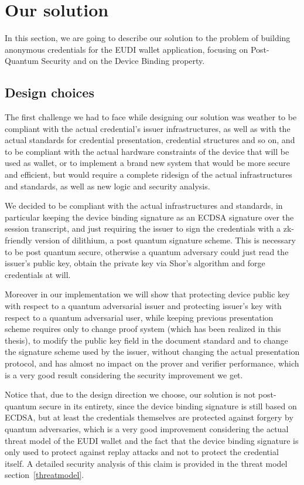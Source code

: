 \documentclass{article}
\begin{document}
\section{Our solution}
\label{oursolution}
In this section, we are going to describe our solution to the problem of building anonymous credentials for the EUDI wallet
application, focusing on Post-Quantum Security and on the Device Binding property.

\subsection{Design choices}
\label{designchoice}
The first challenge we had to face while designing our solution was weather to be compliant with the actual credential's
issuer infrastructures, as well as with the actual standards for credential presentation, credential structures and so on,
and to be compliant with the actual hardware constraints of the device that will be used as wallet, or to implement a brand
new system that would be more secure and efficient, but would require a complete ridesign of the actual infrastructures and 
standards, as well as new logic and security analysis.

We decided to be compliant with the actual infrastructures and standards, in particular keeping the device binding signature
as an ECDSA signature over the session transcript, and just requiring the issuer to sign the credentials with a zk-friendly version of 
dilithium, a post quantum signature scheme. This is necessary to be post quantum secure, otherwise a quantum adversary could
just read the issuer's public key, obtain the private key via Shor's algorithm and forge credentials at will.

Moreover in our implementation we will show that protecting device public key with respect to a quantum adversarial issuer
and protecting issuer's key with respect to a quantum adversarial user, while keeping previous presentation scheme requires
only to change proof system (which has been realized in this thesis), to modify the public key field in the document standard
and to change the signature scheme used by the issuer, without changing the actual presentation protocol, and has almost
no impact on the prover and verifier performance, which is a very good result considering the security improvement we get.

Notice that, due to the design direction we choose, our solution is not post-quantum secure in its entirety, since the device binding
signature is still based on ECDSA, but at least the credentials themselves are protected against forgery by quantum adversaries, 
which is a very good improvement considering the actual threat model of the EUDI wallet and the fact that the device binding 
signature is only used to protect against replay attacks and not to protect the credential itself. A detailed security analysis of
this claim is provided in the threat model section~\cref{threatmodel}.
\end{document}
